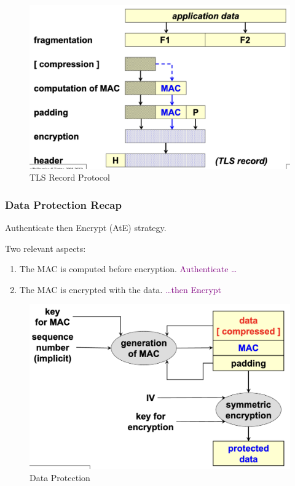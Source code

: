 \begin{figure}[H]
    \centering
    \includegraphics[width=0.5\linewidth]{Images/Appsec/record_protocol.png}
    \caption{TLS Record Protocol}
\end{figure}


\subsubsection*{Data Protection Recap}
\begin{center}
    Authenticate then Encrypt (AtE) strategy.
\end{center}
\begin{multicols}{2}
    \raggedcolumns
    Two relevant aspects:

    \vspace{0.2cm}

    \begin{enumerate}
        \item The MAC is computed before encryption. \textcolor{Purple}{Authenticate \dots}
        \item The MAC is encrypted with the data. \textcolor{Purple}{\dots then Encrypt}
    \end{enumerate}

\columnbreak

    \begin{figure}[H]
        \centering
        \includegraphics[width=\linewidth]{Images/Appsec/data_prot.png}
        \caption{Data Protection}
    \end{figure}
\end{multicols}

